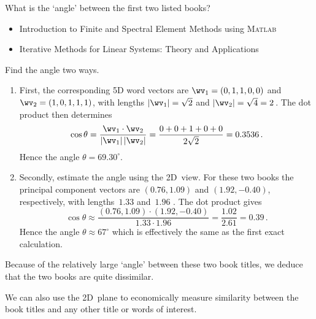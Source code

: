 \begin{reduce}
\begin{example} 
What is the `angle' between the first two listed books?
\begin{itemize}
\item Introduction to Finite and Spectral Element Methods using \textsc{Matlab}
\item Iterative Methods for Linear Systems: Theory and Applications 
\end{itemize}
\begin{solution} 
Find the angle two ways.
\begin{enumerate}
\item First, the corresponding 5D word vectors are \(\wv_1=(0,1,1,0,0)\) and \(\wv_2=(1,0,1,1,1)\), with lengths \(|\wv_1|=\sqrt2\) and \(|\wv_2|=\sqrt4=2\)\,.
The dot product then determines
\begin{equation*}
\cos\theta=\frac{\wv_1\cdot\wv_2}{|\wv_1|\,|\wv_2|}
=\frac{0+0+1+0+0}{2\sqrt2} =0.3536\,.
\end{equation*}
Hence the angle \(\theta=69.30^\circ\).
\item Secondly, estimate the angle using the 2D~view.
For these two books the principal component vectors are \((0.76,1.09)\) and \((1.92,-0.40)\), respectively, with lengths~\(1.33\) and~\(1.96\) \twodp.
The dot product gives
\begin{equation*}
\cos\theta\approx \frac{(0.76,1.09)\cdot(1.92,-0.40)}{1.33\cdot 1.96}
= \frac{1.02}{2.61}=0.39\,.
\end{equation*}
Hence the angle \(\theta\approx67^\circ\) which is effectively the same as the first exact calculation.
\end{enumerate}
Because of the relatively large `angle' between these two book titles, we deduce that the two books are quite dissimilar.
\end{solution}
\end{example}

We can also use the 2D~plane to economically measure similarity between the book titles and any other title or words of interest.


\end{reduce}
